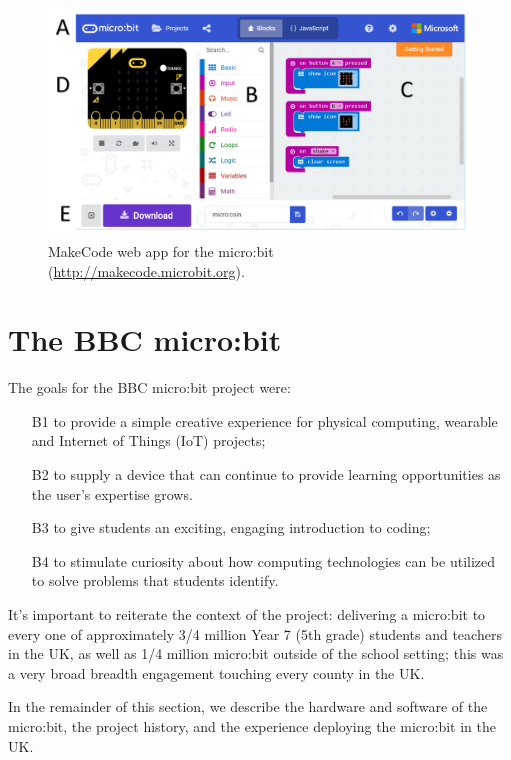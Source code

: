 \begin{figure}[t]
    \includegraphics[width=6in]{images/webApp.png}
    \caption{\label{fig:snapshot}MakeCode web app for the micro:bit (\url{http://makecode.microbit.org}).}
  \end{figure}

\section{The BBC micro:bit}
\label{sec:microbit}

The goals for the BBC micro:bit project were:
\begin{itemize}
    \item[B1] to provide a simple creative experience for physical computing, wearable and Internet of Things (IoT) projects;
    \item[B2] to supply a device that can continue to provide learning opportunities as the user's expertise grows.
    \item[B3] to give students an exciting, engaging introduction to coding;
    \item[B4] to stimulate curiosity about how computing technologies can be utilized to solve problems that students identify.
\end{itemize}

It's important to reiterate the context of the project: 
delivering a micro:bit to every one of 
approximately 3/4 million Year 7 (5th grade) students and teachers in the UK, as
well as 1/4 million micro:bit outside of the school setting; this was a very
broad breadth engagement touching every county in the UK.

In the remainder of this section, we describe the hardware and software
of the micro:bit, the project history, and the experience deploying
the micro:bit in the UK.

